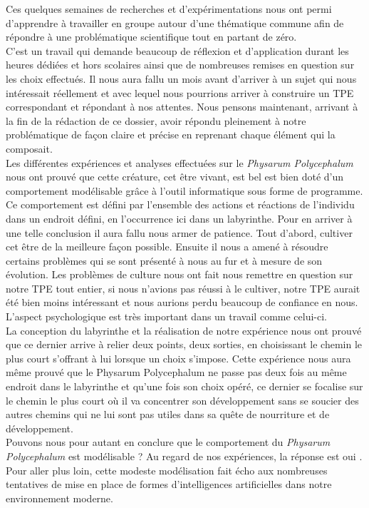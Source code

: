 \documentclass[]{report}
\theoremstyle{definition}
\begin{document}
{Ces quelques semaines de recherches et d'expérimentations nous ont permi d’apprendre à travailler en groupe autour d’une thématique commune afin de répondre à une problématique scientifique tout en partant de zéro.}\\
{C’est un travail qui demande beaucoup de réflexion et d’application durant les heures dédiées et hors scolaires ainsi que de nombreuses remises en question sur les choix effectués. Il nous aura fallu un mois avant d’arriver à un sujet qui nous intéressait réellement et avec lequel nous pourrions arriver à construire un TPE correspondant et répondant à nos attentes.  
Nous pensons maintenant, arrivant à la fin de la rédaction de ce dossier, avoir répondu pleinement à notre problématique de façon claire et précise en reprenant chaque élément qui la composait.}\\
{Les différentes expériences et analyses effectuées sur le \textit{Physarum Polycephalum} nous ont prouvé que cette créature, cet être vivant, est bel est bien doté d’un comportement modélisable grâce à l’outil informatique sous forme de programme. Ce comportement est défini par l’ensemble des actions et réactions de l’individu dans un endroit défini, en l'occurrence ici dans un labyrinthe.
Pour en arriver à une telle conclusion il aura fallu nous armer de patience.
Tout d’abord, cultiver cet être de la meilleure façon possible. Ensuite il  nous a amené  à résoudre certains problèmes qui se sont présenté à nous au fur et à mesure de son évolution.
Les problèmes de culture nous ont fait nous remettre en question sur notre TPE tout entier, si nous n’avions pas réussi à le cultiver, notre TPE aurait été bien moins intéressant et nous aurions perdu beaucoup de confiance en nous. L’aspect psychologique est très important dans un travail comme celui-ci.}\\
{La conception du labyrinthe et la réalisation de notre expérience nous ont prouvé que ce dernier arrive à relier deux points, deux sorties, en choisissant le chemin le plus court s'offrant à lui lorsque un choix s’impose. Cette expérience nous aura même prouvé que le Physarum Polycephalum ne passe pas deux fois au même endroit dans le labyrinthe et qu’une fois son choix opéré, ce dernier se focalise sur le chemin le plus court où il va concentrer son développement sans se soucier des autres chemins qui ne lui sont pas utiles dans sa quête de nourriture et de développement.}\\

{Pouvons nous pour autant en conclure que le comportement du \textit{Physarum Polycephalum} est modélisable ?
Au regard de nos expériences, la réponse est oui .}\\

{Pour aller plus loin, cette modeste modélisation fait écho aux nombreuses tentatives de mise en place de formes d’intelligences artificielles dans notre environnement moderne.}

\printbibliography
\end{document}

